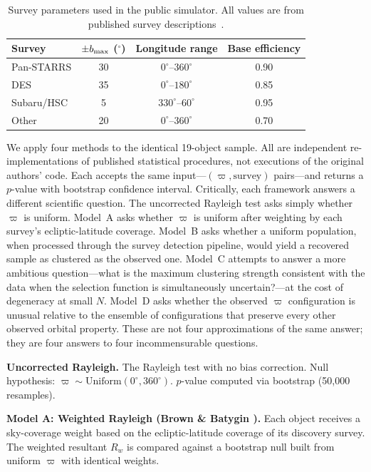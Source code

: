\documentclass[12pt,a4paper]{article}
\begin{document}
\begin{table}[h]
\centering
\caption{Survey parameters used in the public simulator. All values are from published survey descriptions~\cite{shankman2017,brown2019,napier2021}.}
\label{tab:surveys}
\footnotesize
\begin{tabular}{lccc}
\hline
Survey & $\pm b_{\rm max}$ ($^\circ$) & Longitude range & Base efficiency \\
\hline
Pan-STARRS & 30 & $0^\circ$--$360^\circ$ & 0.90 \\
DES        & 35 & $0^\circ$--$180^\circ$ & 0.85 \\
Subaru/HSC &  5 & $330^\circ$--$60^\circ$ & 0.95 \\
Other      & 20 & $0^\circ$--$360^\circ$ & 0.70 \\
\hline
\end{tabular}
\end{table}

We apply four methods to the identical 19-object sample. All are independent re-implementations of published statistical procedures, not executions of the original authors' code. Each accepts the same input---$(\varpi, \mathrm{survey})$ pairs---and returns a $p$-value with bootstrap confidence interval. Critically, each framework answers a different scientific question. The uncorrected Rayleigh test asks simply whether $\varpi$ is uniform. Model~A asks whether $\varpi$ is uniform after weighting by each survey's ecliptic-latitude coverage. Model~B asks whether a uniform population, when processed through the survey detection pipeline, would yield a recovered sample as clustered as the observed one. Model~C attempts to answer a more ambitious question---what is the maximum clustering strength consistent with the data when the selection function is simultaneously uncertain?---at the cost of degeneracy at small $N$. Model~D asks whether the observed $\varpi$ configuration is unusual relative to the ensemble of configurations that preserve every other observed orbital property. These are not four approximations of the same answer; they are four answers to four incommensurable questions.

\textbf{Uncorrected Rayleigh.} The Rayleigh test with no bias correction. Null hypothesis: $\varpi \sim \mathrm{Uniform}(0^\circ, 360^\circ)$. $p$-value computed via bootstrap (50,000 resamples).

\textbf{Model A: Weighted Rayleigh (Brown \& Batygin \cite{brown2019}).} Each object receives a sky-coverage weight based on the ecliptic-latitude coverage of its discovery survey. The weighted resultant $R_w$ is compared against a bootstrap null built from uniform $\varpi$ with identical weights.
\end{document}
